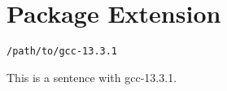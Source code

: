 
\chapter{\label{package-extension}Package Extension}
\begin{verbatim}
/path/to/gcc-13.3.1
\end{verbatim}

\par This is a sentence with gcc-13.3.1.
